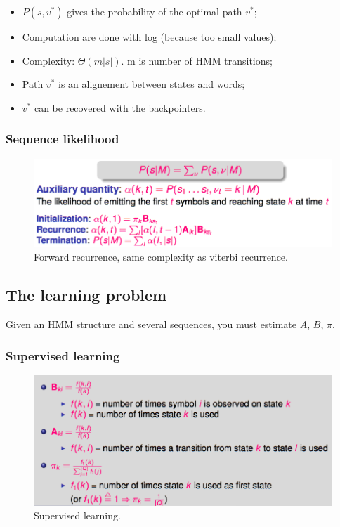 \begin{itemize}
	\item $P(s, v^*)$ gives the probability of the optimal path $v^*$;
	\item Computation are done with log (because too small values);
	\item Complexity: $\Theta(m|s|)$. m is number of HMM transitions;
	\item Path $v^*$ is an alignement between states and words;
	\item $v^*$ can be recovered with the backpointers.
\end{itemize}


\subsubsection{Sequence likelihood}

\begin{figure}[htp]
	\centering
	\includegraphics[scale=0.5]{images/28_forward.png}
 	\caption{Forward recurrence, same complexity as viterbi recurrence.}
\end{figure}

\subsection{The learning problem}

Given an HMM structure and several sequences, you must estimate $A$, $B$, $\pi$.


\subsubsection{Supervised learning}

\begin{figure}[H]
	\centering
	\includegraphics[scale=0.5]{images/29_supervised.png}
 	\caption{Supervised learning.}
\end{figure}

